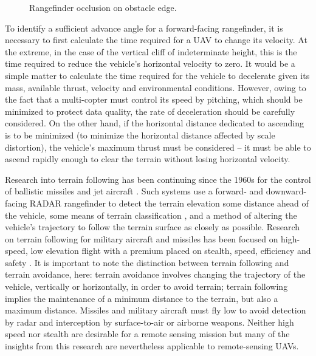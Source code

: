 \documentclass[10pt]{article}
\begin{document}
\begin{figure}
\centering
\def\svgscale{0.8}

\caption{Rangefinder occlusion on obstacle edge.}
\label{fig:uav_edge_occlude}
\end{figure}

To identify a sufficient advance angle for a forward-facing rangefinder, it is necessary to first calculate the time required for a UAV to change its velocity. At the extreme, in the case of the vertical cliff of indeterminate height, this is the time required to reduce the vehicle's horizontal velocity to zero. It would be a simple matter to calculate the time required for the vehicle to decelerate given its mass, available thrust, velocity and environmental conditions. However, owing to the fact that a multi-copter must control its speed by pitching, which should be minimized to protect data quality, the rate of deceleration should be carefully considered. On the other hand, if the horizontal distance dedicated to ascending is to be minimized (to minimize the horizontal distance affected by scale distortion), the vehicle's maximum thrust must be considered -- it must be able to ascend rapidly enough to clear the terrain without losing horizontal velocity.

Research into terrain following has been continuing since the 1960s for the control of ballistic missiles and jet aircraft \cite{KRACHMALNICK1968,Starling1971,Cunningham1980}. Such systems use a forward- and downward-facing RADAR rangefinder to detect the terrain elevation some distance ahead of the vehicle, some means of terrain classification \cite{Cunningham1980}, and a method of altering the vehicle's trajectory to follow the terrain surface as closely as possible. Research on terrain following for military aircraft and missiles has been focused on high-speed, low elevation flight with a premium placed on stealth, speed, efficiency and safety \cite{KRACHMALNICK1968}. It is important to note the distinction between terrain following and terrain avoidance, here: terrain avoidance involves changing the trajectory of the vehicle, vertically or horizontally, in order to avoid terrain; terrain following implies the maintenance of a minimum distance to the terrain, but also a maximum distance. Missiles and military aircraft must fly low to avoid detection by radar and interception by surface-to-air or airborne weapons. Neither high speed nor stealth are desirable for a remote sensing mission but many of the insights from this research are nevertheless applicable to remote-sensing UAVs.
\end{document}
